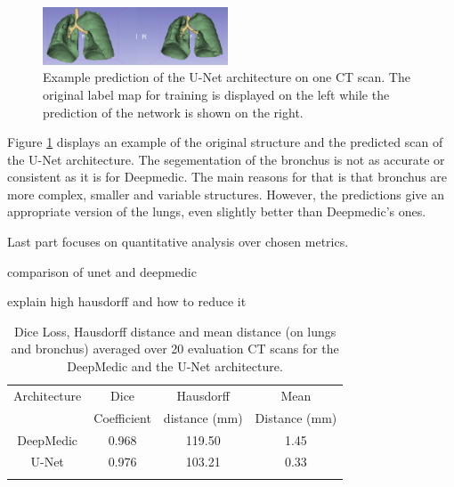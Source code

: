 \begin{figure}[h!]
	\includegraphics[width=0.49\textwidth, angle=0]{files/predunet.png}
	\caption{Example prediction of the U-Net architecture on one CT scan. The original label map for training is displayed on the left while the prediction of the network is shown on the right.}
	\label{pred_unet}
\end{figure}

Figure \ref{pred_unet} displays an example of the original structure and the predicted scan of the U-Net architecture. The segementation of the bronchus is not as accurate or consistent as it is for Deepmedic. The main reasons for that is that bronchus are more complex, smaller and variable structures. However, the predictions give an appropriate version of the lungs, even slightly better than Deepmedic's ones.\newline\newline

Last part focuses on quantitative analysis over chosen metrics.




comparison of unet and deepmedic

explain high hausdorff and how to reduce it


\begin{table}[h!]
	\caption{Dice Loss, Hausdorff distance and mean distance (on lungs and bronchus) averaged over 20 evaluation CT scans for the DeepMedic and the U-Net architecture.}
	\label{table_result}
	\centering
	\setlength{\tabcolsep}{10pt}
	\renewcommand{\arraystretch}{1.5}
	\begin{tabular}{c c c c}
		\hline 
		Architecture & Dice & Hausdorff & Mean \\
		& Coefficient & distance (mm) & Distance (mm) \\ 
		\hline 
		DeepMedic & 0.968 & 119.50 & 1.45 \\ 
		U-Net & 0.976 & 103.21 & 0.33 \\ 
		\hline
		\newline 
	\end{tabular}

\end{table}
